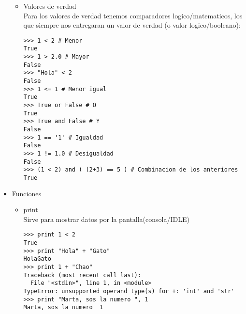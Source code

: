 \begin{itemize}
\begin{itemize}
        \item Valores de verdad\\
            Para los valores de verdad tenemos comparadores logico/matematicos, los que siempre nos entregaran un valor de verdad (o valor logico/booleano):
            \begin{lstlisting}[style=consola]
>>> 1 < 2 # Menor
True
>>> 1 > 2.0 # Mayor
False
>>> "Hola" < 2
False
>>> 1 <= 1 # Menor igual
True
>>> True or False # O
True
>>> True and False # Y
False
>>> 1 == '1' # Igualdad
False
>>> 1 != 1.0 # Desigualdad
False
>>> (1 < 2) and ( (2+3) == 5 ) # Combinacion de los anteriores
True
            \end{lstlisting}
    \end{itemize}
    \item Funciones\\
        \begin{itemize}
            \item print\\
                Sirve para mostrar datos por la pantalla(consola/IDLE)
            \begin{lstlisting}[style=consola]
>>> print 1 < 2
True
>>> print "Hola" + "Gato"
HolaGato
>>> print 1 + "Chao"
Traceback (most recent call last):
  File "<stdin>", line 1, in <module>
TypeError: unsupported operand type(s) for +: 'int' and 'str'
>>> print "Marta, sos la numero ", 1
Marta, sos la numero  1
            \end{lstlisting}           
        \end{itemize}

\end{itemize}
